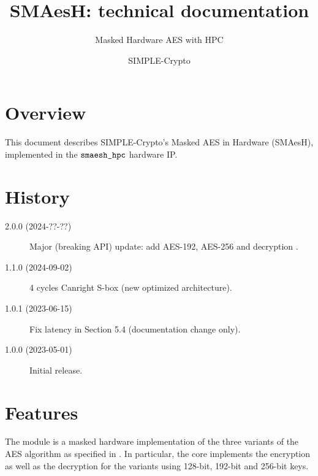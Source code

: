 \documentclass{scrartcl}
\title{SMAesH: technical documentation}
\subtitle{Masked Hardware AES with HPC}
\author{SIMPLE-Crypto}
\date{}
\begin{document}


\maketitle

\tableofcontents

\section{Overview}
\label{section:overview}
This document describes SIMPLE-Crypto's Masked AES in Hardware (SMAesH),
implemented in the $\texttt{smaesh\_hpc}$ hardware IP. 

\section{History}
\begin{description}
    \item[2.0.0 (2024-??-??)] Major (breaking API) update: add AES-192, AES-256 and decryption .
    \item[1.1.0 (2024-09-02)] 4 cycles Canright S-box (new optimized architecture).
    \item[1.0.1 (2023-06-15)] Fix latency in Section 5.4 (documentation change only).
    \item[1.0.0 (2023-05-01)] Initial release.
\end{description}

\section{Features}
The \core{} module is a masked hardware implementation of the three variants of
the AES algorithm as specified in \cite{nist197}. In particular, the core
implements the encryption as well as the decryption for the variants using
128-bit, 192-bit and 256-bit keys.  
\end{document}
